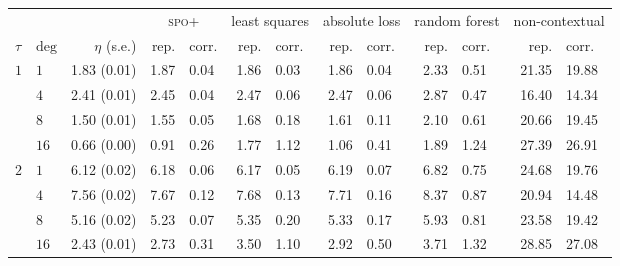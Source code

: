\begin{tabular}{@{}llrr@{\,$\to$\,}lr@{\,$\to$\,}lr@{\,$\to$\,}lr@{\,$\to$\,}lr@{\,$\to$\,}l@{}}
\toprule
& & & \multicolumn{2}{c}{\textsc{spo+}} & \multicolumn{2}{c}{least squares} & \multicolumn{2}{c}{absolute loss} & \multicolumn{2}{c}{random forest} & \multicolumn{2}{c}{non-contextual} \\
\(\tau\) & \(\mathrm{deg}\) & \(\eta\) (s.e.) & rep. & corr. & rep. & corr. & rep. & corr. & rep. & corr. & rep. & corr. \\
\midrule
\(1\) & \(1\) & 1.83 (0.01) & 1.87 & 0.04 & 1.86 & 0.03 & 1.86 & 0.04 & 2.33 & 0.51 & 21.35 & 19.88 \\
 & \(4\) & 2.41 (0.01) & 2.45 & 0.04 & 2.47 & 0.06 & 2.47 & 0.06 & 2.87 & 0.47 & 16.40 & 14.34 \\
 & \(8\) & 1.50 (0.01) & 1.55 & 0.05 & 1.68 & 0.18 & 1.61 & 0.11 & 2.10 & 0.61 & 20.66 & 19.45 \\
 & \(16\) & 0.66 (0.00) & 0.91 & 0.26 & 1.77 & 1.12 & 1.06 & 0.41 & 1.89 & 1.24 & 27.39 & 26.91 \\
\addlinespace
\(2\) & \(1\) & 6.12 (0.02) & 6.18 & 0.06 & 6.17 & 0.05 & 6.19 & 0.07 & 6.82 & 0.75 & 24.68 & 19.76 \\
 & \(4\) & 7.56 (0.02) & 7.67 & 0.12 & 7.68 & 0.13 & 7.71 & 0.16 & 8.37 & 0.87 & 20.94 & 14.48 \\
 & \(8\) & 5.16 (0.02) & 5.23 & 0.07 & 5.35 & 0.20 & 5.33 & 0.17 & 5.93 & 0.81 & 23.58 & 19.42 \\
 & \(16\) & 2.43 (0.01) & 2.73 & 0.31 & 3.50 & 1.10 & 2.92 & 0.50 & 3.71 & 1.32 & 28.85 & 27.08 \\
\bottomrule
\end{tabular}
